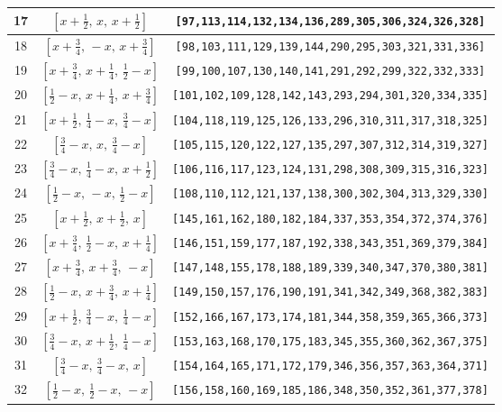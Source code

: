 \documentclass[fleqn,8pt]{jsarticle}
\begin{document}
\begin{longtable}{ccc}
17 & $\left[ x + \frac{1}{2},\, x,\, x + \frac{1}{2} \right]$ & {\tt [97,113,114,132,134,136,289,305,306,324,326,328]} \\ \hline
18 & $\left[ x + \frac{3}{4},\, - x,\, x + \frac{3}{4} \right]$ & {\tt [98,103,111,129,139,144,290,295,303,321,331,336]} \\ \hline
19 & $\left[ x + \frac{3}{4},\, x + \frac{1}{4},\, \frac{1}{2} - x \right]$ & {\tt [99,100,107,130,140,141,291,292,299,322,332,333]} \\ \hline
20 & $\left[ \frac{1}{2} - x,\, x + \frac{1}{4},\, x + \frac{3}{4} \right]$ & {\tt [101,102,109,128,142,143,293,294,301,320,334,335]} \\ \hline
21 & $\left[ x + \frac{1}{2},\, \frac{1}{4} - x,\, \frac{3}{4} - x \right]$ & {\tt [104,118,119,125,126,133,296,310,311,317,318,325]} \\ \hline
22 & $\left[ \frac{3}{4} - x,\, x,\, \frac{3}{4} - x \right]$ & {\tt [105,115,120,122,127,135,297,307,312,314,319,327]} \\ \hline
23 & $\left[ \frac{3}{4} - x,\, \frac{1}{4} - x,\, x + \frac{1}{2} \right]$ & {\tt [106,116,117,123,124,131,298,308,309,315,316,323]} \\ \hline
24 & $\left[ \frac{1}{2} - x,\, - x,\, \frac{1}{2} - x \right]$ & {\tt [108,110,112,121,137,138,300,302,304,313,329,330]} \\ \hline
25 & $\left[ x + \frac{1}{2},\, x + \frac{1}{2},\, x \right]$ & {\tt [145,161,162,180,182,184,337,353,354,372,374,376]} \\ \hline
26 & $\left[ x + \frac{3}{4},\, \frac{1}{2} - x,\, x + \frac{1}{4} \right]$ & {\tt [146,151,159,177,187,192,338,343,351,369,379,384]} \\ \hline
27 & $\left[ x + \frac{3}{4},\, x + \frac{3}{4},\, - x \right]$ & {\tt [147,148,155,178,188,189,339,340,347,370,380,381]} \\ \hline
28 & $\left[ \frac{1}{2} - x,\, x + \frac{3}{4},\, x + \frac{1}{4} \right]$ & {\tt [149,150,157,176,190,191,341,342,349,368,382,383]} \\ \hline
29 & $\left[ x + \frac{1}{2},\, \frac{3}{4} - x,\, \frac{1}{4} - x \right]$ & {\tt [152,166,167,173,174,181,344,358,359,365,366,373]} \\ \hline
30 & $\left[ \frac{3}{4} - x,\, x + \frac{1}{2},\, \frac{1}{4} - x \right]$ & {\tt [153,163,168,170,175,183,345,355,360,362,367,375]} \\ \hline
31 & $\left[ \frac{3}{4} - x,\, \frac{3}{4} - x,\, x \right]$ & {\tt [154,164,165,171,172,179,346,356,357,363,364,371]} \\ \hline
32 & $\left[ \frac{1}{2} - x,\, \frac{1}{2} - x,\, - x \right]$ & {\tt [156,158,160,169,185,186,348,350,352,361,377,378]} \\
\end{longtable}
\end{document}
